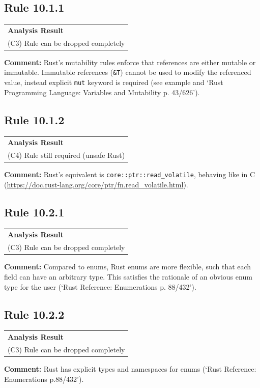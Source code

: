 \subsection*{Rule 10.1.1}
\begin{longtable}{p{13cm}}
\textbf{Analysis Result} \\
(C3) Rule can be dropped completely \\
\end{longtable}
\textbf{Comment:} Rust's mutability rules enforce that references are either mutable or immutable. Immutable references (\texttt{\&T}) cannot be used to modify the referenced value, instead explicit \texttt{mut} keyword is required (see example and `Rust Programming Language: Variables and Mutability p. 43/626'). \\


\subsection*{Rule 10.1.2}
\begin{longtable}{p{13cm}}
\textbf{Analysis Result} \\
(C4) Rule still required (unsafe Rust) \\
\end{longtable}
\textbf{Comment:} Rust's equivalent is \texttt{core::ptr::read\_volatile}, behaving like in C (\url{https://doc.rust-lang.org/core/ptr/fn.read_volatile.html}). \\
\subsection*{Rule 10.2.1}
\begin{longtable}{p{13cm}}
\textbf{Analysis Result} \\
(C3) Rule can be dropped completely \\
\end{longtable}
\textbf{Comment:} Compared to \Cpp enums, Rust enums are more flexible, such that each field can have an arbitrary type. This satisfies the rationale of an obvious enum type for the user (`Rust Reference: Enumerations p. 88/432'). \\
\subsection*{Rule 10.2.2}
\begin{longtable}{p{13cm}}
\textbf{Analysis Result} \\
(C3) Rule can be dropped completely \\
\end{longtable}
\textbf{Comment:} Rust has explicit types and namespaces for enums (`Rust Reference: Enumerations p.88/432'). \\
